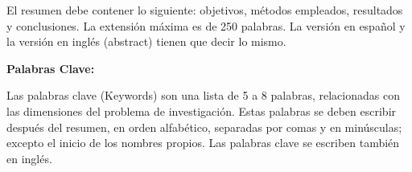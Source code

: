 \begin{resumen}

El resumen debe contener lo siguiente: objetivos, métodos empleados, resultados y conclusiones. La extensión máxima es de 250 palabras. La versión en español y la versión en inglés (abstract) tienen que decir lo mismo.

\textbf{Palabras Clave:} 

Las palabras clave (Keywords) son una lista de 5 a 8 palabras, relacionadas con las dimensiones del problema de investigación. Estas palabras se deben escribir después del resumen, en orden alfabético, separadas por comas y en minúsculas; excepto el inicio de los nombres propios. Las palabras clave se escriben también en inglés.

\end{resumen}


